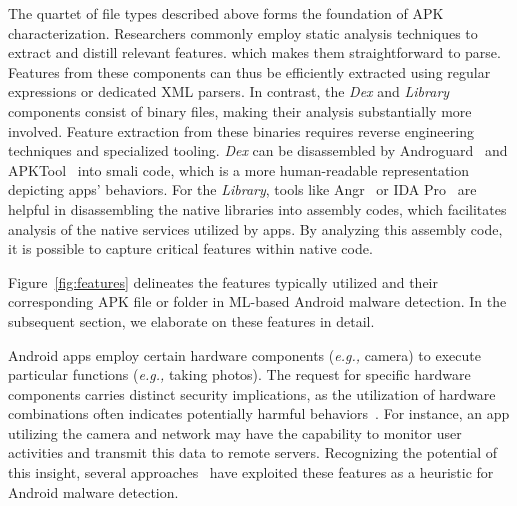 The quartet of file types described above forms the foundation of APK characterization. Researchers commonly employ static analysis techniques to extract and distill relevant features.
 which makes them straightforward to parse. Features from these components can thus be efficiently extracted using regular expressions or dedicated XML parsers.
In contrast, the \textit{Dex} and \textit{Library} components consist of binary files, making their analysis substantially more involved. Feature extraction from these binaries requires reverse engineering techniques and specialized tooling.
\textit{Dex} can be disassembled by Androguard~\cite{androguard} and APKTool~\cite{apkt} into smali code, which is a more human-readable representation depicting apps' behaviors.
For the \textit{Library}, tools like Angr~\cite{angr} or IDA Pro~\cite{ida_pro} are helpful in disassembling the native libraries into assembly codes, which facilitates analysis of the native services utilized by apps.
By analyzing this assembly code, it is possible to capture critical features within native code.
%


Figure~\ref{fig:features} delineates the features typically utilized and their corresponding APK file or folder in ML-based Android malware detection.
In the subsequent section, we elaborate on these features in detail.

Android apps employ certain hardware components (\textit{e.g.,} camera) to execute particular functions (\textit{e.g.,} taking photos).
The request for specific hardware components carries distinct security implications, as the utilization of hardware combinations often indicates potentially harmful behaviors~\cite{arp2014drebin}.
For instance, an app utilizing the camera and network may have the capability to monitor user activities and transmit this data to remote servers.
Recognizing the potential of this insight, several approaches~\cite{arp2014drebin,xu2018deeprefiner,kim2018multimodal,wang2019effective} have exploited these features as a heuristic for Android malware detection.

